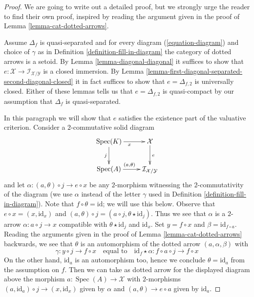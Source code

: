 \documentclass[10pt,a4paper]{amsart}
\theoremstyle{plain}
\theoremstyle{definition}
\theoremstyle{remark}
\numberwithin{equation}{subsection}
\def\Spec{\mathop{\mathrm{Spec}}}
\begin{document}
\begin{proof}
We are going to write out a detailed proof, but we strongly urge the
reader to find their own proof, inspired by reading the argument
given in the proof of Lemma \ref{lemma-cat-dotted-arrows}.

\medskip\noindent
Assume $\Delta_f$ is quasi-separated and for every diagram
(\ref{equation-diagram}) and choice of $\gamma$ as in
Definition \ref{definition-fill-in-diagram}
the category of dotted arrows is a setoid.
By Lemma \ref{lemma-diagonal-diagonal} it suffices to show that
$e : \mathcal{X} \to \mathcal{I}_{\mathcal{X}/\mathcal{Y}}$
is a closed immersion. By
Lemma \ref{lemma-first-diagonal-separated-second-diagonal-closed}
it in fact suffices to show that $e = \Delta_{f, 2}$ is
universally closed.
Either of these lemmas tells us that $e = \Delta_{f, 2}$ is quasi-compact
by our assumption that $\Delta_f$ is quasi-separated.

\medskip\noindent
In this paragraph we will show that $e$ satisfies the existence
part of the valuative criterion. Consider a $2$-commutative solid diagram
$$
\xymatrix{
\Spec(K) \ar[r]_x \ar[d]_j & \mathcal{X} \ar[d]^e \\
\Spec(A) \ar[r]^{(a, \theta)} & \mathcal{I}_{\mathcal{X}/\mathcal{Y}}
}
$$
and let $\alpha : (a, \theta) \circ j \to e \circ x$ be any $2$-morphism
witnessing the $2$-commutativity of the diagram (we use $\alpha$ instead
of the letter $\gamma$ used in Definition \ref{definition-fill-in-diagram}).
Note that $f \circ \theta = \text{id}$; we will use this below.
Observe that $e \circ x = (x, \text{id}_x)$ and
$(a, \theta) \circ j = (a \circ j, \theta \star \text{id}_j)$.
Thus we see that $\alpha$ is a $2$-arrow $\alpha : a \circ j \to x$
compatible with $\theta \star \text{id}_j$ and $\text{id}_x$.
Set $y = f \circ x$ and $\beta = \text{id}_{f \circ a}$.
Reading the arguments given in the proof of
Lemma \ref{lemma-cat-dotted-arrows}
backwards, we see that $\theta$ is an automorphism of the
dotted arrow $(a, \alpha, \beta)$ with
$$
\gamma : y \circ j \to f \circ x
\quad\text{equal to}\quad
\text{id}_f \star \alpha : f \circ a \circ j \to f \circ x
$$
On the other hand, $\text{id}_a$ is an automorphism too, hence
we conclude $\theta = \text{id}_a$ from the assumption on $f$.
Then we can take as dotted arrow for the displayed diagram above
the morphism $a : \Spec(A) \to \mathcal{X}$ with $2$-morphisms
$(a, \text{id}_a) \circ j \to (x, \text{id}_x)$ given by $\alpha$
and $(a, \theta) \to e \circ a$ given by $\text{id}_a$.


\end{proof}
\end{document}
